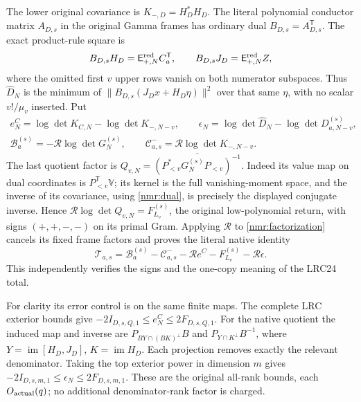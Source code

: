 The lower original covariance is $K_{-,D}=H_D^*H_D$.
The literal polynomial conductor matrix $A_{D,s}$ in the original
Gamma frames has ordinary dual $B_{D,s}=A_{D,s}^{\mathsf T}$.
The exact product-rule square is
\[
B_{D,s}H_D=\mathsf E_{+,N}^{\rm red}C_a^{\mathsf T},
\qquad
B_{D,s}J_D=\mathsf E_{+,N}^{\rm red}Z,
\]
where the omitted first $v$ upper rows vanish on both numerator
subspaces. Thus $\widehat D_N$ is the minimum of
$\|B_{D,s}(J_Dx+H_D\eta)\|^2$ over that same $\eta$, with no
scalar $v!/\mu_v$ inserted.
Put
\begin{equation}\tag{NMR8}\label{nmr:corrections}
\begin{gathered}
e_N^C=\log\det K_{C,N}-\log\det K_{-,N-v},\qquad
\epsilon_N=\log\det\widehat D_N-\log\det D_{a,N-v}^{(s)},\\
\mathcal B_a^{(s)}=-\mathcal R\log\det G_N^{(s)},\qquad
\mathcal C^-_{a,s}=\mathcal R\log\det K_{-,N-v}.
\end{gathered}
\end{equation}
The last quotient factor is
$Q_{v,N}=\overline{(P_{<v}^*G_N^{(s)}P_{<v})^{-1}}$.
Indeed its value map on dual coordinates is
$P_{<v}^{\mathsf T}\mathbb V$; its kernel is the full
vanishing-moment space, and the inverse of its covariance, using
\eqref{nmr:dual}, is precisely the displayed conjugate inverse.
Hence
$\mathcal R\log\det Q_{v,N}=F_{L_v}^{(s)}$, the original
low-polynomial return, with signs $(+,+,-,-)$ on its primal Gram.
Applying $\mathcal R$ to \eqref{nmr:factorization} cancels its fixed
frame factors and proves the literal native identity
\begin{equation}\tag{NMR9}\label{nmr:total}
\mathcal T_{a,s}
=\mathcal B_a^{(s)}-\mathcal C^-_{a,s}
 -\mathcal R e^C-F_{L_v}^{(s)}-\mathcal R\epsilon .
\end{equation}
This independently verifies the signs and the one-copy meaning of
the LRC24 total.

For clarity its error control is on the same finite maps. The complete
LRC exterior bounds give
$-2I_{D,s,Q,1}\leq e_N^C\leq2F_{D,s,Q,1}$.
For the native quotient the induced map and inverse are
$P_{B Y\cap(BK)^\perp}B$ and $P_{Y\cap K^\perp}B^{-1}$,
where $Y=\operatorname{im}[H_D,J_D]$, $K=\operatorname{im}H_D$.
Each projection removes exactly the relevant denominator. Taking the
top exterior power in dimension $m$ gives
$-2I_{D,s,m,1}\leq\epsilon_N\leq2F_{D,s,m,1}$.
These are the original all-rank bounds, each $O_{\rm actual}(q)$;
no additional denominator-rank factor is charged.

